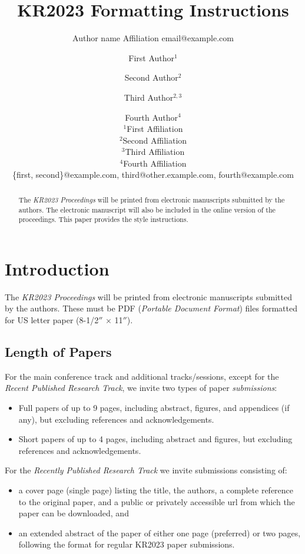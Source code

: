 \documentclass{article}
\title{KR2023 Formatting Instructions}
\author{%
    Author name
    \affiliations
    Affiliation
    \emails
    email@example.com    %
}
\author{%
First Author$^1$\and
Second Author$^2$\and
Third Author$^{2,3}$\and
Fourth Author$^4$ \\
\affiliations
$^1$First Affiliation\\
$^2$Second Affiliation\\
$^3$Third Affiliation\\
$^4$Fourth Affiliation \\
\emails
\{first, second\}@example.com,
third@other.example.com,
fourth@example.com
}
\begin{document}
\maketitle

\begin{abstract}
  The \textit{KR2023 Proceedings} will be printed from electronic
  manuscripts submitted by the authors. The electronic man\-u\-script will
  also be included in the online version of the proceedings. This paper
  provides the style instructions.
\end{abstract}

\section{Introduction}

The \textit{KR2023 Proceedings} will be printed from electronic
manuscripts submitted by the authors. These must be PDF (\emph{Portable
Document Format}) files formatted for US letter paper (8-1/2$''$ $\times$ 11$''$).

\subsection{Length of Papers}

For the main conference track and additional tracks/sessions, except for the
\emph{Recent Published Research Track}, we invite two types of paper
\emph{submissions}:
\begin{itemize}
\item Full papers of up to 9 pages, including abstract, figures, and appendices
  (if any), but excluding references and acknowledgements.
\item Short papers of up to 4 pages, including abstract and figures, but excluding
 references and acknowledgements.
\end{itemize}

For the \emph{Recently Published Research Track} we invite submissions consisting
of:
\begin{itemize}
\item a cover page (single page) listing the title, the authors, a complete
  reference to the original paper, and a public or privately accessible url
  from which the paper can be downloaded, and
\item an extended abstract of the paper of either one page (preferred) or two
  pages, following the format for regular KR2023 paper submissions.
\end{itemize}
\end{document}
